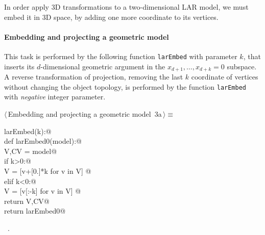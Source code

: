 \documentclass[11pt,oneside]{article}	%
\begin{document}
In order apply 3D transformations to a two-dimensional LAR model, we must embed it in 3D space, by adding one more coordinate to its vertices. 

\paragraph{Embedding and projecting a geometric model}

This task is performed by the following function \texttt{larEmbed} with parameter $k$, that inserts its $d$-dimensional geometric argument in the $x_{d+1}, \ldots, x_{d+k}=0$ subspace.
A reverse transformation of projection, removing the last $k$ coordinate of vertices without changing the object topology, is performed by the function \texttt{larEmbed} with \emph{negative} integer parameter.


\begin{flushleft} \small \label{scrap4}
\protect{}$\langle\,$Embedding and projecting a geometric model\nobreak\ {\footnotesize 3a}$\,\rangle\equiv$
\vspace{-1ex}
\begin{list}{}{} \item
\mbox{}\verb@def larEmbed(k):@\\
\mbox{}\verb@   def larEmbed0(model):@\\
\mbox{}\verb@      V,CV = model@\\
\mbox{}\verb@      if k>0:@\\
\mbox{}\verb@         V = [v+[0.]*k for v in V] @\\
\mbox{}\verb@      elif k<0:@\\
\mbox{}\verb@         V = [v[:-k] for v in V] @\\
\mbox{}\verb@      return V,CV@\\
\mbox{}\verb@   return larEmbed0@\\
\mbox{}\verb@@{\NWsep}
\end{list}
\vspace{-1ex}
\footnotesize\addtolength{\baselineskip}{-1ex}
\begin{list}{}{\setlength{\itemsep}{-\parsep}\setlength{\itemindent}{-\leftmargin}}
\item \NWtxtMacroRefIn\ .
\end{list}
\end{flushleft}
\end{document}

